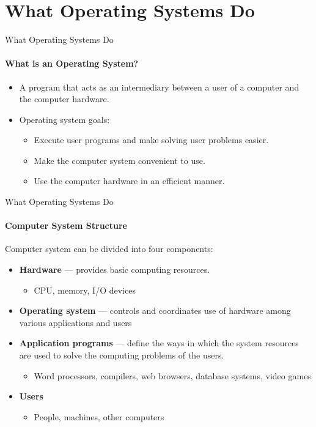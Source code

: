 \documentclass[10pt]{beamer}
\begin{document}
\section[1.Intro OS]{What Operating Systems Do}
\begin{frame}{What Operating Systems Do}
\framesubtitle{What is an Operating System?}
\begin{itemize}
\item A \alert{program} that acts as an intermediary between a user of a computer and the computer hardware.
\item Operating system goals:
\begin{itemize}
\item Execute user programs and make solving user problems \alert{easier}.
\item Make the computer system \alert{convenient} to use.
\item Use the computer hardware in an \alert{efficient} manner.
\end{itemize}
\end{itemize}
\end{frame}

\begin{frame}{What Operating Systems Do}
\framesubtitle{Computer System Structure}
Computer system can be divided into four components:
\begin{itemize}
\item \textbf{Hardware} --- provides basic computing resources.
\begin{itemize}
\item CPU, memory, I/O devices
\end{itemize}
\item \alert{\textbf{Operating system}} --- controls and coordinates use of hardware among various applications and users
\item \textbf{Application programs} --- define the ways in which the system resources are used to solve the computing problems of the users.
\begin{itemize}
\item Word processors, compilers, web browsers, database systems, video games
\end{itemize}
\item \textbf{Users}
\begin{itemize}
\item People, machines, other computers
\end{itemize}
\end{itemize}
\end{frame}
\end{document}
